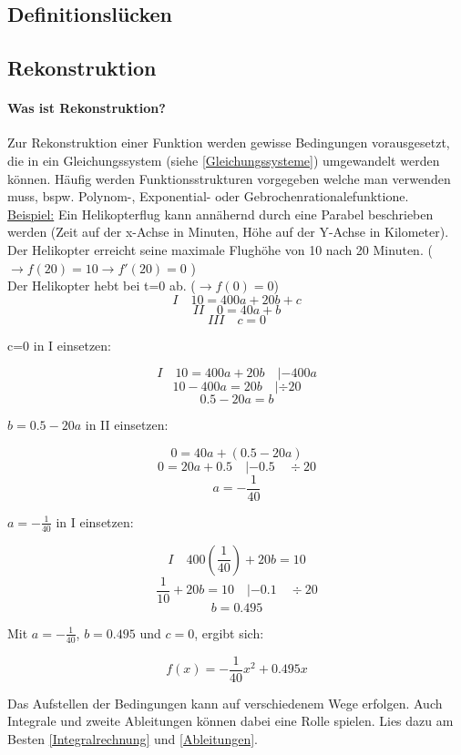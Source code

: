\documentclass{article}
\begin{document}
	\subsection{Definitionslücken}\label{Definitionslücke}
	
	\subsection{Rekonstruktion}\label{Rekonstruktion}
		\paragraph{Was ist Rekonstruktion?}
			Zur Rekonstruktion einer Funktion werden gewisse Bedingungen vorausgesetzt, die in ein Gleichungssystem (siehe \ref{Gleichungssysteme}) umgewandelt werden können. Häufig werden Funktionsstrukturen vorgegeben welche man verwenden muss, bspw. Polynom-, Exponential- oder Gebrochenrationalefunktione. \\
			\underline{Beispiel:} Ein Helikopterflug kann annähernd durch eine Parabel beschrieben werden (Zeit auf der x-Achse in Minuten, Höhe auf der Y-Achse in Kilometer). \\
			Der Helikopter erreicht seine maximale Flughöhe von 10 nach 20 Minuten. ( $ \rightarrow f(20)=10 \rightarrow f'(20)=0 $ ) \\
			Der Helikopter hebt bei t=0 ab. ($ \rightarrow f(0)=0$) \\
			
			\[ I \quad 10=400a+20b+c \]
			\[ II \quad 0=40a+b \]
			\[ III \quad c=0 \]
			
			c=0 in I einsetzen:
			
			\[I \quad 10=400a+20b \quad |-400a \]
			\[ 10-400a=20b \quad | \div 20\]
			\[ 0.5-20a=b\]
			
			$b= 0.5-20a $ in II einsetzen:
			
			\[ 0=40a+(0.5-20a)\]
			\[ 0=20a+0.5 \quad |-0.5 \quad \div 20\]
			\[ a=-\frac{1}{40} \]
			
			$a=-\frac{1}{40}$ in I einsetzen:
			
			\[ I \quad 400(\frac{1}{40})+20b=10 \]
			\[ \frac{1}{10}+20b=10 \quad |-0.1 \quad \div 20\]
			\[ b=0.495\]
			
			Mit $a=-\frac{1}{40}$, $b=0.495$ und $c=0$, ergibt sich:
			
			\[f(x)=-\frac{1}{40}x^2+0.495x\]
			
			Das Aufstellen der Bedingungen kann auf verschiedenem Wege erfolgen. Auch Integrale und zweite Ableitungen können dabei eine Rolle spielen.
			Lies dazu am Besten \ref{Integralrechnung} und \ref{Ableitungen}.
		
\end{document}
